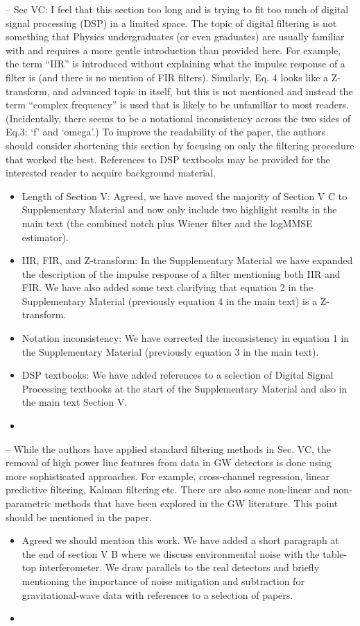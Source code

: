 \documentclass{article}
\begin{document}
\noindent
-- Sec VC: I feel that this section too long and is trying to fit too much of digital signal processing (DSP) in a limited space. The topic of digital filtering is not something that Physics undergraduates (or even graduates) are usually familiar with and requires a more gentle introduction than provided here. For example, the term ``IIR'' is introduced without explaining what the impulse response of a filter is (and there is no mention of FIR filters). Similarly, Eq. 4 looks like a Z-transform, and advanced topic in itself, but this is not mentioned and instead the term ``complex frequency'' is used that is likely to be unfamiliar to most readers. (Incidentally, there seems to be a notational inconsistency across the two sides of Eq.3: `f' and `omega'.) To improve the readability of the paper, the authors should consider shortening this section by focusing on only the filtering procedure that worked the best. References to DSP textbooks may be provided for the interested reader to acquire background material. 
\begin{itemize}
\item Length of Section V: Agreed, we have moved the majority of Section V C to Supplementary Material and now only include two highlight results in the main text (the combined notch plus Wiener filter and the logMMSE estimator). 
\item IIR, FIR, and Z-transform: In the Supplementary Material we have expanded the description of the impulse response of a filter mentioning both IIR and FIR. We have also added some text clarifying that equation 2 in the Supplementary Material (previously equation 4 in the main text) is a Z-transform. 
\item Notation inconsistency: We have corrected the inconsistency in equation 1 in the Supplementary Material (previously equation 3 in the main text). 
\item DSP textbooks: We have added references to a selection of Digital Signal Processing textbooks at the start of the Supplementary Material and also in the main text Section V.
\item[]
\end{itemize}

\noindent
-- While the authors have applied standard filtering methods in Sec. VC, the removal of high power line features from data in GW detectors is done using more sophisticated approaches. For example, cross-channel regression, linear predictive filtering, Kalman filtering etc. There are also some non-linear and non-parametric methods that have been explored in the GW literature. This point should be mentioned in the paper.
\begin{itemize}
\item Agreed we should mention this work. We have added a short paragraph at the end of section V B where we discuss environmental noise with the table-top interferometer. We draw parallels to the real detectors and briefly mentioning the importance of noise mitigation and subtraction for gravitational-wave data with references to a selection of papers.
\item[]
\end{itemize}
\end{document}
